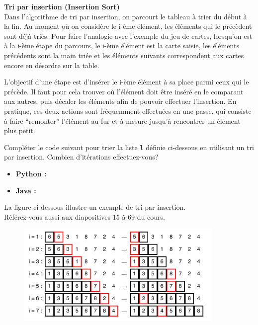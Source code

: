 \begin{Exercice} [20 minutes] \textbf{Tri par insertion (Insertion Sort)} \\

    Dans l'algorithme de tri par insertion, on parcourt le tableau à trier du début à la fin. Au moment où on considère le i-ème élément, les éléments qui le précèdent sont déjà triés. Pour faire l'analogie avec l'exemple du jeu de cartes, lorsqu'on est à la i-ème étape du parcours, le i-ème élément est la carte saisie, les éléments précédents sont la main triée et les éléments suivants correspondent aux cartes encore en désordre sur la table. 
    
    L'objectif d'une étape est d'insérer le i-ème élément à sa place parmi ceux qui le précède. Il faut pour cela trouver où l'élément doit être inséré en le comparant aux autres, puis décaler les éléments afin de pouvoir effectuer l'insertion. En pratique, ces deux actions sont fréquemment effectuées en une passe, qui consiste à faire ``remonter'' l'élément au fur et à mesure jusqu'à rencontrer un élément plus petit. 
    
    Compléter le code suivant pour trier la liste \lstinline{l} définie ci-dessous en utilisant un tri par insertion. Combien d'itérations effectuez-vous?
    \begin{itemize}
        \item \textbf{Python :}
             
        \item \textbf{Java :}
             
    \end{itemize}
    
    \begin{conseil}
        La figure ci-dessous illustre un exemple de tri par insertion. \\
        Référez-vous aussi aux diapositives 15 à 69 du cours.
    \end{conseil}
    
    \begin{figure}[h!]
        \centering
        \includegraphics[width=10cm]{ressources/tri_insertion.png}
    \end{figure}


\end{Exercice}
